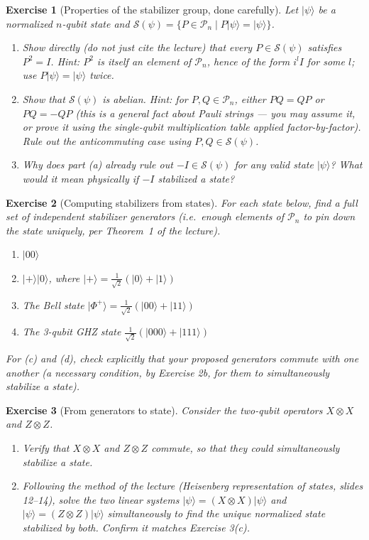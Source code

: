 \documentclass[11pt]{article}
\newtheorem*{exercise}{Exercise}
\newcommand{\ket}[1]{\lvert #1 \rangle}
\newcommand{\Pn}{\mathcal{P}_n}
\newcommand{\Sop}{\mathcal{S}}
\begin{document}
\begin{exercise}[Properties of the stabilizer group, done carefully]
Let $\ket{\psi}$ be a normalized $n$-qubit state and
$\Sop(\psi) = \{P \in \Pn \mid P\ket\psi = \ket\psi\}$.
\begin{enumerate}[label=(\alph*)]
    \item Show directly (do not just cite the lecture) that every
    $P \in \Sop(\psi)$ satisfies $P^2 = I$. \emph{Hint:} $P^2$ is itself an
    element of $\Pn$, hence of the form $i^l I$ for some $l$; use
    $P\ket\psi=\ket\psi$ twice.
    \item Show that $\Sop(\psi)$ is abelian. \emph{Hint:} for $P,Q \in \Pn$,
    either $PQ = QP$ or $PQ = -QP$ (this is a general fact about Pauli
    strings --- you may assume it, or prove it using the single-qubit
    multiplication table applied factor-by-factor). Rule out the
    anticommuting case using $P,Q \in \Sop(\psi)$.
    \item Why does part (a) already rule out $-I \in \Sop(\psi)$ for any
    valid state $\ket\psi$? What would it mean physically if $-I$ stabilized
    a state?
\end{enumerate}
\end{exercise}

\begin{exercise}[Computing stabilizers from states]
For each state below, find a full set of independent stabilizer generators
(i.e.\ enough elements of $\Pn$ to pin down the state uniquely, per
Theorem~1 of the lecture).
\begin{enumerate}[label=(\alph*)]
    \item $\ket{00}$
    \item $\ket{+}\ket{0}$, where $\ket{+} = \tfrac{1}{\sqrt2}(\ket0+\ket1)$
    \item The Bell state $\ket{\Phi^+} = \tfrac{1}{\sqrt2}(\ket{00}+\ket{11})$
    \item The 3-qubit GHZ state $\tfrac{1}{\sqrt2}(\ket{000}+\ket{111})$
\end{enumerate}
For (c) and (d), check explicitly that your proposed generators commute
with one another (a necessary condition, by Exercise 2b, for them to
simultaneously stabilize a state).
\end{exercise}

\begin{exercise}[From generators to state]
Consider the two-qubit operators $X\otimes X$ and $Z \otimes Z$.
\begin{enumerate}[label=(\alph*)]
    \item Verify that $X\otimes X$ and $Z\otimes Z$ commute, so that they
    could simultaneously stabilize a state.
    \item Following the method of the lecture (Heisenberg representation of
    states, slides 12--14), solve the two linear systems
    $\ket\psi = (X\otimes X)\ket\psi$ and $\ket\psi = (Z\otimes Z)\ket\psi$
    simultaneously to find the unique normalized state stabilized by both.
    Confirm it matches Exercise 3(c).
\end{enumerate}
\end{exercise}
\end{document}
